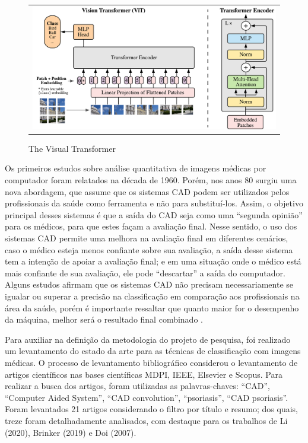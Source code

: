 \begin{figure}[h]
  \centering
    \begin{tabular}{c}
      \includegraphics[scale=0.4]{images/model_scheme.pdf}
    \end{tabular}
    \caption{The Visual Transformer}
    \label{fig:vit-arch}
\end{figure}

Os primeiros estudos sobre análise quantitativa de imagens médicas por computador foram relatados na década de 1960. Porém, nos anos 80 surgiu uma nova abordagem, que assume que os sistemas CAD podem ser utilizados pelos profissionais da saúde como ferramenta e não para substituí-los. Assim, o objetivo principal desses sistemas é que a saída do CAD seja como uma “segunda opinião” para os médicos, para que estes façam a avaliação final. Nesse sentido, o uso dos sistemas CAD permite uma melhora na avaliação final em diferentes cenários, caso o médico esteja menos confiante sobre sua avaliação, a saída desse sistema tem a intenção de apoiar a avaliação final; e em uma situação onde o médico está mais confiante de sua avaliação, ele pode “descartar” a saída do computador. Alguns estudos afirmam que os sistemas CAD não precisam necessariamente se igualar ou superar a precisão na classificação em comparação aos profissionais na área da saúde, porém é importante ressaltar que quanto maior for o desempenho da máquina, melhor será o resultado final combinado \cite{DOI2007198}.


Para auxiliar na definição da metodologia do projeto de pesquisa, foi realizado um levantamento do estado da arte para as técnicas de classificação com imagens médicas. O processo de levantamento bibliográfico considerou o levantamento de artigos científicos nas bases científicas MDPI, IEEE, Elsevier e Scopus. Para realizar a busca dos artigos, foram utilizadas as palavras-chaves: “CAD”, “Computer Aided System”, “CAD convolution”, “psoriasis”, “CAD psoriasis”. Foram levantados 21 artigos considerando o filtro por título e resumo; dos quais, treze foram detalhadamente analisados, com destaque para os trabalhos de Li (2020), Brinker (2019) e Doi (2007).



